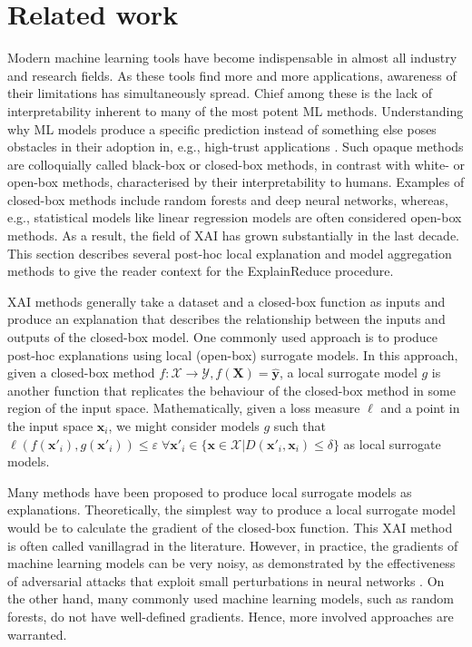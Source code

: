 \section{Related work}
Modern machine learning tools have become indispensable in almost all industry and research fields.
As these tools find more and more applications, awareness of their limitations has simultaneously spread.
Chief among these is the lack of interpretability inherent to many of the most potent ML methods.
Understanding why ML models produce a specific prediction instead of something else poses obstacles in their adoption in, e.g., high-trust applications \cite{dosilovic2018survey}.
Such opaque methods are colloquially called black-box or closed-box methods, in contrast with white- or open-box methods, characterised by their interpretability to humans.
Examples of closed-box methods include random forests and deep neural networks, whereas, e.g., statistical models like linear regression models are often considered open-box methods.
As a result, the field of XAI has grown substantially in the last decade.
This section describes several post-hoc local explanation and model aggregation methods to give the reader context for the {\sc ExplainReduce} procedure.

XAI methods generally take a dataset and a closed-box function as inputs and produce an explanation that describes the relationship between the inputs and outputs of the closed-box model.
One commonly used approach is to produce post-hoc explanations using local (open-box) surrogate models.
In this approach, given a closed-box method $f: \mathcal{X} \rightarrow \mathcal{Y}, f(\bm{X}) = \hat{\bm{y}}$, a local surrogate model $g$ is another function that replicates the behaviour of the closed-box method in some region of the input space.
Mathematically, given a loss measure $\ell$ and a point in the input space $\bm{x}_i$, we might consider models $g$ such that $\ell(f(\bm{x}'_i), g(\bm{x}'_i)) \leq \varepsilon \; \forall \bm{x}'_i \in \{\bm{x} \in \mathcal{X} | D(\bm{x}'_i, \bm{x}_i) \leq \delta \}$ as local surrogate models.

Many methods have been proposed to produce local surrogate models as explanations.
Theoretically, the simplest way to produce a local surrogate model would be to calculate the gradient of the closed-box function.
This XAI method is often called {\sc vanillagrad} in the literature.
However, in practice, the gradients of machine learning models can be very noisy, as demonstrated by the effectiveness of adversarial attacks that exploit small perturbations in neural networks \cite{szegedy2014intriguing}.
On the other hand, many commonly used machine learning models, such as random forests, do not have well-defined gradients.
Hence, more involved approaches are warranted. 

